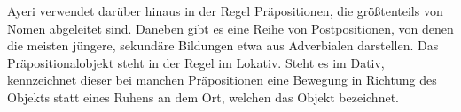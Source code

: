 \documentclass[
	12pt,
	ngerman,
]{scrartcl}
\begin{document}
Ayeri verwendet darüber hinaus in der Regel Präpositionen, die größtenteils von
Nomen abgeleitet sind. Daneben gibt es eine Reihe von Postpositionen, von denen
die meisten jüngere, sekundäre Bildungen etwa aus Adverbialen darstellen. Das
Präpositionalobjekt steht in der Regel im Lokativ. Steht es im Dativ,
kennzeichnet dieser bei manchen Präpositionen eine Bewegung in Richtung des
Objekts statt eines Ruhens an dem Ort, welchen das Objekt bezeichnet.



\begingroup\multicolsep=0pt
\printglossary[
	style=threecolumn,
	type=leipzig,
	title={Abkürzungen der Glossierung},
]
\endgroup

\printbibliography[heading=bibintoc]
\end{document}
